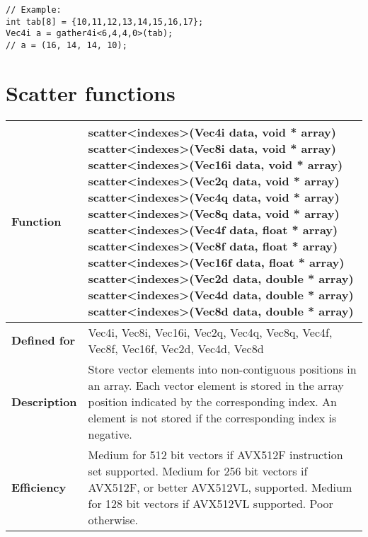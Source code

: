 \documentclass[vcl_manual.tex]{subfiles}
\begin{document}
\begin{lstlisting}[frame=none]
// Example:
int tab[8] = {10,11,12,13,14,15,16,17};
Vec4i a = gather4i<6,4,4,0>(tab);
// a = (16, 14, 14, 10);
\end{lstlisting}


\section{Scatter functions}\label{Scatter functions}

\begin{tabular}{|p{30mm}|p{120mm}|} \hline
\bfseries Function & scatter\textless indexes\textgreater(Vec4i data, void * array) \newline
scatter\textless indexes\textgreater(Vec8i data, void * array) \newline
scatter\textless indexes\textgreater(Vec16i data, void * array) \newline
scatter\textless indexes\textgreater(Vec2q data, void * array) \newline
scatter\textless indexes\textgreater(Vec4q data, void * array) \newline
scatter\textless indexes\textgreater(Vec8q data, void * array) \newline
scatter\textless indexes\textgreater(Vec4f data, float * array) \newline
scatter\textless indexes\textgreater(Vec8f data, float * array) \newline
scatter\textless indexes\textgreater(Vec16f data, float * array) \newline
scatter\textless indexes\textgreater(Vec2d data, double * array) \newline
scatter\textless indexes\textgreater(Vec4d data, double * array) \newline
scatter\textless indexes\textgreater(Vec8d data, double * array) \\ \hline
\bfseries Defined for & 
Vec4i, Vec8i, Vec16i, Vec2q, Vec4q, Vec8q, \newline
Vec4f, Vec8f, Vec16f, Vec2d, Vec4d, Vec8d \\ \hline
\bfseries Description & Store vector elements into non-contiguous positions in an array. Each vector element is stored in the array position indicated by the corresponding index. An element is not stored if the corresponding index is negative. \\ \hline
\bfseries Efficiency & 
Medium for 512 bit vectors if AVX512F instruction set supported. \newline
Medium for 256 bit vectors if AVX512F, or better AVX512VL, supported. \newline
Medium for 128 bit vectors if AVX512VL supported. \newline
Poor otherwise. \\ \hline
\end{tabular}
\end{document}
